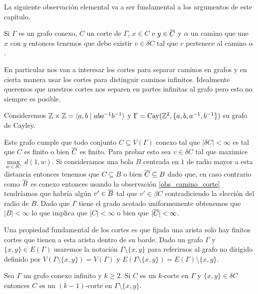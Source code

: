\documentclass[tesis.tex]{subfiles}
\begin{document}
La siguiente observación elemental va a ser fundamental a los argumentos de este capítulo.

\begin{obs}\label{obs_camino_corte}
	Si $\Gamma$ es un grafo conexo, $C$ un corte de $\Gamma$, $x \in C$ e $y \in \overline C$ y 
	$\alpha$ un camino que une $x$ con $y$ 
	entonces tenemos que debe existir $v \in \delta C$ tal que $v$ pertenece al camino $\alpha$.
\end{obs} 


En particular nos van a interesar los cortes para separar caminos en grafos y en cierta manera usar los cortes para distinguir caminos infinitos.
Idealmente queremos que nuestros cortes nos separen en partes infinitas al grafo pero esto no siempre es posible.

\begin{ej}
	Consideremos $\mathbb{Z} \times \mathbb{Z} = \langle a,b \mid aba^{-1}b^{-1} \rangle$ y 
	$\Gamma = \text{Cay}(\mathbb{Z}^2, \{ a, b,a^{-1},b^{-1} \})$ su grafo de Cayley.
	
	Este grafo cumple que todo conjunto $C \subseteq V(\Gamma)$ conexo tal que $|\delta C| < \infty$ es tal que $C$ es finito o bien $\overline C$ es finito.
	Para probar esto sea $v \in \delta C$ tal que
	maximice $\underset{w \in \delta C}{\max} \ d(1,w)$.
	Si consideramos una bola $B$ centrada en $1$ de radio mayor a esta distancia entonces tenemos que $C \subseteq B$ o bien $\overline C \subseteq B$ dado que, en caso contrario como $\overline B$ es conexo entonces usando la observación \ref{obs_camino_corte} tendríamos que habría algún $v' \in \overline B$ tal que $v' \in \beta C$ contradiciendo la elección del radio de $B$.
	Dado que $\Gamma$ tiene el grado acotado uniformemente obtenemos que  $|B| < \infty$ lo que implica que $|C| < \infty$ o bien que $|\overline C| < \infty$.
\end{ej}

Una propiedad fundamental de los cortes es que fijada una arista solo hay finitos cortes que tienen a esta arista dentro de su borde.	
Dado un grafo $\Gamma$ y $\{x,y\} \in E(\Gamma)$  usaremos la notación $\Gamma \setminus \{ x,y \}$ para referirnos al grafo no dirigido definido por $V(\Gamma \setminus \{ x,y \}) = V(\Gamma)$ y $E(\Gamma \setminus \{ x,y \}) = E(\Gamma) \setminus \{x,y\}$.

\begin{lema}\label{obs_kCorte_restriccion}
	Sea $\Gamma$ un grafo conexo infinito y $k \ge 2$.
	Si $C$ es un $k$-corte en $\Gamma$ y $\{ x,y  \} \in \delta C$ entonces $C$ es un $(k-1)$-corte en $ \Gamma \setminus \{ x,y \} $.
\end{lema}
\end{document}
